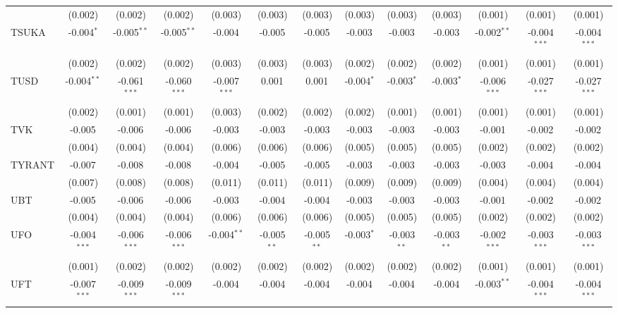 \begin{table}[!htbp]
\begin{tabular}{@{\extracolsep{5pt}}lcccccccccccc}
  & (0.002) & (0.002) & (0.002) & (0.003) & (0.003) & (0.003) & (0.003) & (0.003) & (0.003) & (0.001) & (0.001) & (0.001) \\
 TSUKA & -0.004$^{*}$ & -0.005$^{**}$ & -0.005$^{**}$ & -0.004$^{}$ & -0.005$^{}$ & -0.005$^{}$ & -0.003$^{}$ & -0.003$^{}$ & -0.003$^{}$ & -0.002$^{**}$ & -0.004$^{***}$ & -0.004$^{***}$ \\
  & (0.002) & (0.002) & (0.002) & (0.003) & (0.003) & (0.003) & (0.002) & (0.002) & (0.002) & (0.001) & (0.001) & (0.001) \\
 TUSD & -0.004$^{**}$ & -0.061$^{***}$ & -0.060$^{***}$ & -0.007$^{***}$ & 0.001$^{}$ & 0.001$^{}$ & -0.004$^{*}$ & -0.003$^{*}$ & -0.003$^{*}$ & -0.006$^{***}$ & -0.027$^{***}$ & -0.027$^{***}$ \\
  & (0.002) & (0.001) & (0.001) & (0.003) & (0.002) & (0.002) & (0.002) & (0.001) & (0.001) & (0.001) & (0.001) & (0.001) \\
 TVK & -0.005$^{}$ & -0.006$^{}$ & -0.006$^{}$ & -0.003$^{}$ & -0.003$^{}$ & -0.003$^{}$ & -0.003$^{}$ & -0.003$^{}$ & -0.003$^{}$ & -0.001$^{}$ & -0.002$^{}$ & -0.002$^{}$ \\
  & (0.004) & (0.004) & (0.004) & (0.006) & (0.006) & (0.006) & (0.005) & (0.005) & (0.005) & (0.002) & (0.002) & (0.002) \\
 TYRANT & -0.007$^{}$ & -0.008$^{}$ & -0.008$^{}$ & -0.004$^{}$ & -0.005$^{}$ & -0.005$^{}$ & -0.003$^{}$ & -0.003$^{}$ & -0.003$^{}$ & -0.003$^{}$ & -0.004$^{}$ & -0.004$^{}$ \\
  & (0.007) & (0.008) & (0.008) & (0.011) & (0.011) & (0.011) & (0.009) & (0.009) & (0.009) & (0.004) & (0.004) & (0.004) \\
 UBT & -0.005$^{}$ & -0.006$^{}$ & -0.006$^{}$ & -0.003$^{}$ & -0.004$^{}$ & -0.004$^{}$ & -0.003$^{}$ & -0.003$^{}$ & -0.003$^{}$ & -0.001$^{}$ & -0.002$^{}$ & -0.002$^{}$ \\
  & (0.004) & (0.004) & (0.004) & (0.006) & (0.006) & (0.006) & (0.005) & (0.005) & (0.005) & (0.002) & (0.002) & (0.002) \\
 UFO & -0.004$^{***}$ & -0.006$^{***}$ & -0.006$^{***}$ & -0.004$^{**}$ & -0.005$^{**}$ & -0.005$^{**}$ & -0.003$^{*}$ & -0.003$^{**}$ & -0.003$^{**}$ & -0.002$^{***}$ & -0.003$^{***}$ & -0.003$^{***}$ \\
  & (0.001) & (0.002) & (0.002) & (0.002) & (0.002) & (0.002) & (0.002) & (0.002) & (0.002) & (0.001) & (0.001) & (0.001) \\
 UFT & -0.007$^{***}$ & -0.009$^{***}$ & -0.009$^{***}$ & -0.004$^{}$ & -0.004$^{}$ & -0.004$^{}$ & -0.004$^{}$ & -0.004$^{}$ & -0.004$^{}$ & -0.003$^{**}$ & -0.004$^{***}$ & -0.004$^{***}$ \\

\end{tabular}
\end{table}
